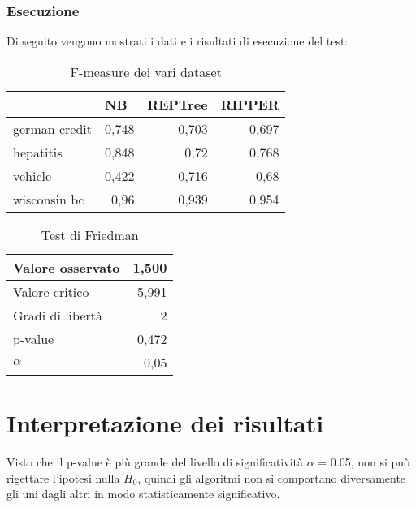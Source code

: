 \subsubsection*{Esecuzione}
Di seguito vengono mostrati i dati e i risultati di esecuzione del test:

\begin{table}[!htbp]
	\centering
	\begin{tabular}{|l|r|r|r|}
		\hline
		              & \multicolumn{1}{l|}{NB} & \multicolumn{1}{l|}{REPTree} & \multicolumn{1}{l|}{RIPPER} \\ \hline
		german credit & 0,748                   & 0,703                        & 0,697                       \\ \hline
		hepatitis     & 0,848                   & 0,72                         & 0,768                       \\ \hline
		vehicle       & 0,422                   & 0,716                        & 0,68                        \\ \hline
		wisconsin bc  & 0,96                    & 0,939                        & 0,954                       \\ \hline
	\end{tabular}
	\caption{F-measure dei vari dataset}
	\label{}
\end{table}

\begin{table}[!htbp]
	\centering
	\begin{tabular}{|l|r|}
		\hline
		Valore osservato  & 1,500 \\ \hline
		Valore critico    & 5,991 \\ \hline
		Gradi di libertà & 2     \\ \hline
		p-value           & 0,472 \\ \hline
		$\alpha$          & 0,05  \\ \hline
	\end{tabular}
	\caption{Test di Friedman}
\end{table}

\clearpage

\section{Interpretazione dei risultati}

Visto che il p-value è più grande del livello di significatività $\alpha$ = 0.05, non si può rigettare l'ipotesi nulla $H_0$, quindi gli algoritmi non si comportano diversamente gli uni dagli altri in modo statisticamente significativo.
